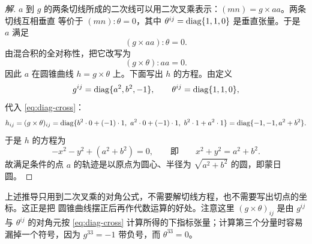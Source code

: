 \begin{proof}[解]
$a$ 到 $g$ 的两条切线所成的二次线可以用二次叉乘表示：$(mn)=g\times aa$。两条切线互相垂直
等价于 $(mn):\theta=0$，其中 $\theta^{ij}=\operatorname{diag}\{1,1,0\}$ 是垂直张量。于是 $a$ 满足
\[
(g\times aa):\theta=0 .
\]
由混合积的全对称性，把它改写为
\[
(g\times \theta):aa=0 .
\]
因此 $a$ 在圆锥曲线 $h=g\times\theta$ 上。下面写出 $h$ 的方程。由定义
\[
g^{ij}=\operatorname{diag}\{a^2,b^2,-1\},\qquad \theta^{ij}=\operatorname{diag}\{1,1,0\},
\]
代入 \eqref{eq:diag-cross}：
\[
h_{ij}=(g\times\theta)_{ij}
=\diag\{b^2\cdot0+(-1)\cdot1,\ a^2\cdot0+(-1)\cdot1,\ b^2\cdot1+a^2\cdot1\}
=\diag\{-1,-1,a^2+b^2\}.
\]
于是 $h$ 的方程为
\[
-x^2-y^2+(a^2+b^2)=0,\qquad\text{即}\qquad x^2+y^2=a^2+b^2 .
\]
故满足条件的点 $a$ 的轨迹是以原点为圆心、半径为 $\sqrt{a^2+b^2}$ 的圆，即蒙日圆。
\end{proof}

\begin{remark}
上述推导只用到二次叉乘的对角公式，不需要解切线方程，也不需要写出切点的坐标。这正是把
圆锥曲线摆正后再作代数运算的好处。注意这里 $(g\times\theta)_{ij}$ 是由 $g^{ij}$ 与
$\theta^{ij}$ 的对角元按 \eqref{eq:diag-cross} 计算所得的下指标张量；计算第三个分量时容易
漏掉一个符号，因为 $g^{33}=-1$ 带负号，而 $\theta^{33}=0$。
\end{remark}
